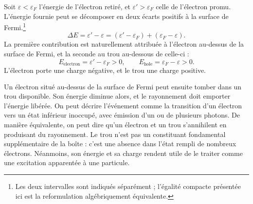 Soit \(\varepsilon<\varepsilon_F\) l’énergie de l’électron retiré, et \(\varepsilon'>\varepsilon_F\) celle de l’électron promu. L’énergie fournie peut se décomposer en deux écarts positifs à la surface de Fermi.\footnote{Les deux intervalles sont indiqués séparément ; l’égalité compacte présentée ici est la reformulation algébriquement équivalente.}
\begin{equation}
\Delta E
=\varepsilon'-\varepsilon
=(\varepsilon'-\varepsilon_F)+(\varepsilon_F-\varepsilon).
\end{equation}
La première contribution est naturellement attribuée à l’électron au-dessus de la surface de Fermi, et la seconde au trou au-dessous de celle-ci :
\begin{equation}
E_{\mathrm{electron}}=\varepsilon'-\varepsilon_F>0,
\qquad
E_{\mathrm{hole}}=\varepsilon_F-\varepsilon>0.
\end{equation}
L’électron porte une charge négative, et le trou une charge positive.

Un électron situé au-dessus de la surface de Fermi peut ensuite tomber dans un trou disponible. Son énergie diminue alors, et le rayonnement doit emporter l’énergie libérée. On peut décrire l’événement comme la transition d’un électron vers un état inférieur inoccupé, avec émission d’un ou de plusieurs photons. De manière équivalente, on peut dire qu’un électron et un trou s’annihilent en produisant du rayonnement. Le trou n’est pas un constituant fondamental supplémentaire de la boîte : c’est une absence dans l’état rempli de nombreux électrons. Néanmoins, son énergie et sa charge rendent utile de le traiter comme une excitation apparentée à une particule.

\begin{classroomqa}
\end{classroomqa}

